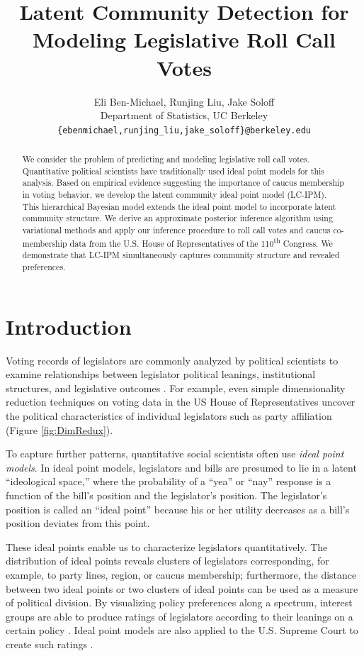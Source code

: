 \documentclass{article}
\title{Latent Community Detection for Modeling Legislative Roll Call Votes}
\author{
  Eli Ben-Michael, Runjing Liu, Jake Soloff \\
  Department of Statistics, UC Berkeley\\
  \texttt{\{ebenmichael,runjing\_liu,jake\_soloff\}@berkeley.edu}
}
\begin{document}

\maketitle

\vspace{-1em}

\begin{abstract}
We consider the problem of predicting and modeling legislative roll call votes. Quantitative political scientists have traditionally used ideal point models for this analysis. Based on empirical evidence suggesting the importance of caucus membership in voting behavior, we develop the latent community ideal point model (LC-IPM). This hierarchical Bayesian model extends the ideal point model to incorporate latent community structure. We derive an approximate posterior inference algorithm using variational methods and apply our inference procedure to roll call votes and caucus co-membership data from the U.S. House of Representatives of the 110\textsuperscript{th} Congress. We demonstrate that LC-IPM simultaneously captures community structure and revealed preferences.
\end{abstract}

\section{Introduction}
\label{introduction}
Voting records of legislators are commonly analyzed by political scientists to examine relationships between legislator political leanings, institutional structures, and legislative outcomes \cite{Clinton2004}. For example, even simple dimensionality reduction techniques on voting data in the US House of Representatives uncover the political characteristics of individual legislators such as party affiliation (Figure \ref{fig:DimRedux}). \par

To capture further patterns, quantitative social scientists often use \textit{ideal point models}. In ideal point models, legislators and bills are presumed to lie in a latent ``ideological space,'' where the probability of a ``yea'' or ``nay'' response is a function of the bill's position and the legislator's position. The legislator's position is called an ``ideal point'' because his or her utility decreases as a bill's position deviates from this point. \par

These ideal points enable us to characterize legislators quantitatively. The distribution of ideal points reveals clusters of legislators corresponding, for example, to party lines, region, or caucus membership; furthermore, the distance between two ideal points or two clusters of ideal points can be used as  a measure of political division. By visualizing policy preferences along a spectrum, interest groups are able to produce ratings of legislators according to their leanings on a certain policy \cite{Clinton2004}. Ideal point models are also applied to the U.S. Supreme Court to create such ratings \cite{Martin2002}. \par
\end{document}
